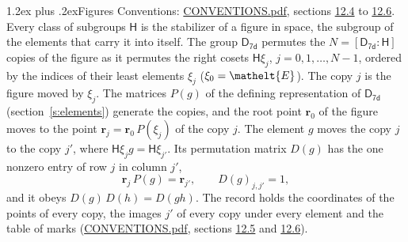 \documentclass[10pt,a4paper]{article}
\makeatletter
\renewcommand\section{\@startsection{section}{1}{\z@}{-3ex plus -1ex minus -.2ex}%
  {1.2ex plus .2ex}{\normalfont\large\sffamily\bfseries\color{parttitle}}}
\numberwithin{equation}{section}
\newcommand{\eltfont}[1]{{\let\sigma\eltsigma\mathelt{#1}}}
\newcommand{\grp}[1]{\mathsf{#1}}
\newcommand{\cls}[1]{\eltfont{#1}}
\newcommand{\pointr}{\mathbf{r}}
\makeatother
\begin{document}
\section{Figures}\label{s:permutation}
Conventions: \href{../../CONVENTIONS.pdf}{CONVENTIONS.pdf}, sections \href{../../CONVENTIONS.pdf\#conv.12.4}{12.4} to \href{../../CONVENTIONS.pdf\#conv.12.6}{12.6}.
Every class of subgroups $\grp{H}$ is the stabilizer of a figure in space, the subgroup of the elements that carry it into itself. \label{n:local.orbit.size}\label{n:element.coset.least}\label{n:index.coset}The group $\grp{D_{7d}}$ permutes the $N = [\grp{D_{7d}} : \grp{H}]$ copies of the figure as it permutes the right cosets $\grp{H}\xi_j$, $j = 0, 1, \dots, N - 1$, ordered by the indices of their least elements $\xi_j$ ($\xi_0 = \cls{E}$). The copy $j$ is the figure moved by $\xi_j$. The matrices $P(g)$ of the defining representation of $\grp{D_{7d}}$ (section~\ref{s:elements}) generate the copies, and the root point $\pointr_0$ of the figure moves to the point $\pointr_j = \pointr_0\, P(\xi_j)$ of the copy $j$. \label{n:local.coset.image}The element $g$ moves the copy $j$ to the copy $j'$, where $\grp{H}\xi_j g = \grp{H}\xi_{j'}$. \label{n:local.matrix.permutation}Its permutation matrix $D(g)$ has the one nonzero entry of row $j$ in column $j'$,
\begin{equation}\label{e:perm.matrix}\pointr_j\, P(g) = \pointr_{j'}, \qquad D(g)_{j,j'} = 1,\end{equation}
and it obeys $D(g)\, D(h) = D(gh)$. The record holds the coordinates of the points of every copy, the images $j'$ of every copy under every element and the table of marks (\href{../../CONVENTIONS.pdf}{CONVENTIONS.pdf}, sections \href{../../CONVENTIONS.pdf\#conv.12.5}{12.5} and \href{../../CONVENTIONS.pdf\#conv.12.6}{12.6}).
\end{document}
